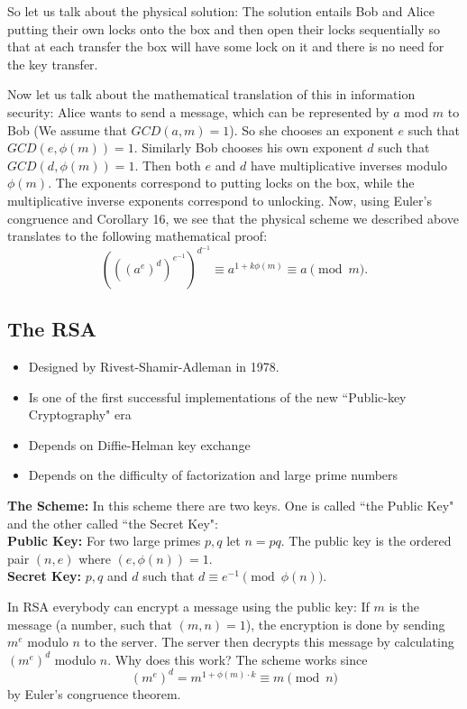 \documentclass[12pt]{article}
\theoremstyle{plain}
\theoremstyle{definition}
\theoremstyle{remark}
\begin{document}
\bigskip
\noindent
So let us talk about the physical solution: The solution entails Bob and Alice putting their own locks onto the box and then open their locks sequentially so that at each transfer the box will have some lock on it and there is no need for the key transfer. 

\bigskip
\noindent 
Now let us talk about the mathematical translation of this in information security:
Alice wants to send a message, which can be represented by $a$ mod $m$ to Bob (We assume that $GCD(a,m)=1$). So she chooses an exponent $e$ such that $GCD(e, \phi(m))=1$. Similarly Bob chooses his own exponent $d$ such that $GCD(d, \phi(m))=1$. Then both $e$ and $d$ have multiplicative inverses modulo $\phi(m)$. The exponents correspond to putting locks on the box, while the multiplicative inverse exponents correspond to unlocking.  Now, using Euler's congruence and Corollary 16, we see that the physical scheme we described above translates to the following mathematical proof:
$$(((a^e)^d)^{e^{-1}})^{d^{-1}} \equiv a^{1+k\phi(m)}\equiv a \pmod{m}.$$

\subsection{The RSA}
\begin{itemize}
    \item Designed by Rivest-Shamir-Adleman in 1978. 
    \item Is one of the first successful implementations of the new ``Public-key Cryptography" era
    \item Depends on Diffie-Helman key exchange
    \item Depends on the difficulty of factorization and large prime numbers
\end{itemize}

\bigskip
\noindent
{\bf The Scheme:} In this scheme there are two keys. One is called ``the Public Key" and the other called ``the Secret Key":
\\
{\bf Public Key:} For two large primes $p, q$ let $n=pq$. The public key is the ordered pair $(n,e)$ where $(e, \phi(n))=1$. 
\\
{\bf Secret Key:} $p, q$ and $d$ such that $d\equiv e^{-1} \pmod{\phi(n)}$.

\bigskip
\noindent
In RSA everybody can encrypt a message using the public key: If $m$ is the message (a number, such that $(m,n)=1$), the encryption is done by sending $m^e$ modulo $n$ to the server. The server then decrypts this message by calculating $(m^e)^d$ modulo $n$. Why does this work? 
The scheme works since 
$$(m^e)^d = m^{1+\phi(m)\cdot k} \equiv m \pmod{n}$$
by Euler's congruence theorem.
\end{document}
